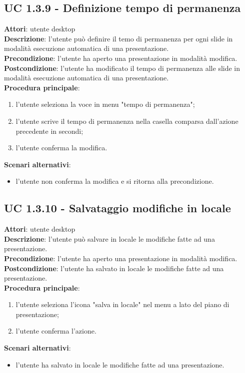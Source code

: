 \subsection{UC 1.3.9 - Definizione tempo di permanenza}{
	\label{uc1.3.9}
	\textbf{Attori}: utente desktop \\
	\textbf{Descrizione}: l'utente può definire il temo di permanenza per ogni slide in modalità esecuzione automatica di una presentazione. \\
	\textbf{Precondizione}: l'utente ha aperto una presentazione in modalità modifica.	\\
	\textbf{Postcondizione}: l'utente ha modificato il tempo di permanenza alle slide in modalità esecuzione automatica di una presentazione.	\\
	\textbf{Procedura principale}:
	\begin{enumerate}
		\item l'utente seleziona la voce in menu "tempo di permanenza";
		\item l'utente scrive il tempo di permanenza nella casella comparsa dall'azione precedente in secondi;
		\item l'utente conferma la modifica.
	\end{enumerate}
	\textbf{Scenari alternativi}:
	\begin{itemize}
		\item l'utente non conferma la modifica  e si ritorna alla precondizione.
	\end{itemize}
}
\subsection{UC 1.3.10 - Salvataggio modifiche in locale}{
	\label{uc1.3.10}
	\textbf{Attori}: utente desktop \\
	\textbf{Descrizione}: l'utente può salvare in locale le modifiche fatte ad una presentazione. \\
	\textbf{Precondizione}: l'utente ha aperto una presentazione in modalità modifica.	\\
	\textbf{Postcondizione}: l'utente ha salvato in locale le modifiche fatte ad una presentazione.	\\
	\textbf{Procedura principale}:
	\begin{enumerate}
		\item l'utente seleziona l'icona "salva in locale" nel menu a lato del piano di presentazione;
		\item l'utente conferma l'azione.
	\end{enumerate}
	\textbf{Scenari alternativi}:
	\begin{itemize}
		\item l'utente ha salvato in locale le modifiche fatte ad una presentazione.
	\end{itemize}
}